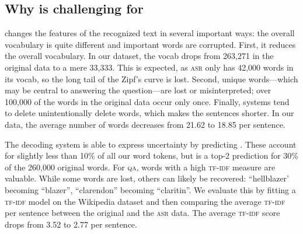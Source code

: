 \subsection{Why  is challenging for }
\label{sec:noise}



         



\asr{} changes the features of the recognized text in several important ways: the overall vocabulary is quite different and important words are corrupted.
First, it reduces the overall vocabulary.  In our dataset, the vocab drops from 263,271 in the original data to a mere 33,333.
This is expected, as \textsc{asr} only has 42,000 words in its vocab, so the long tail of the Zipf's curve is lost.
Second, unique words---which may be central to answering the question---are lost or misinterpreted; over 100,000 of the words in the original data occur only once.
Finally, \asr{} systems tend to delete unintentionally delete words, which makes the sentences shorter.  In our \qb{} data, the average number of words decreases from 21.62 to 18.85 per sentence.

The decoding system is able to express uncertainty by predicting \unk{}.
These account for slightly less than 10\% of all our word tokens, but is a top-2 prediction for 30\% of the 260,000 original words.
For \textsc{qa}, words with a high \textsc{tf-idf} measure are valuable.
While some words are lost, others can likely be recovered: ``hellblazer' becoming ``blazer'', ``clarendon'' becoming ``claritin''.
We evaluate this by fitting a \textsc{tf-idf} model on the Wikipedia dataset and then comparing the average \textsc{tf-idf} per sentence between the original and the \textsc{asr} data.  The average \textsc{tf-idf} score drops from 3.52 to 2.77 per sentence.


 





